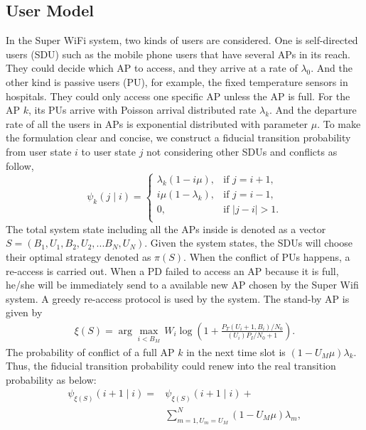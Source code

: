 \documentclass[conference]{IEEEtran}
\begin{document}
\subsection{User Model}
In the Super WiFi system, two kinds of users are considered. One is self-directed users (SDU) such as the mobile phone users that have several APs in its reach. They could decide which AP to access, and they arrive at a rate of \(\lambda_0\). And the other kind is passive users (PU), for example, the fixed temperature sensors in hospitals. They could only access one specific AP unless the AP is full. For the AP \(k\), its PUs arrive with Poisson arrival distributed rate \(\lambda_{k}\). And the departure rate of all the users in APs is exponential distributed with parameter \(\mu\). To make the formulation clear and concise, we construct a fiducial transition probability from user state \(i\) to user state \(j\) not considering other SDUs and conflicts as follow,
\begin{equation} \psi_{k}(j \mid i) =
\begin{cases}
\lambda_k(1 - i\mu), &\mbox{if $j=i+1,$}\\
i\mu(1 - \lambda_k), &\mbox{if $j=i-1,$}\\
0, &\mbox{if $|j-i|>1.$}\\
\end{cases}
\end{equation}
The total system state including all the APs inside is denoted as a vector \(S = (B_1,U_1,B_2,U_2,...B_N,U_N)\). Given the system states, the SDUs will choose their optimal strategy denoted as \(\pi(S)\). When the conflict of PUs happens, a re-access is carried out. When a PD failed to access an AP because it is full, he/she will be immediately send to a available new AP chosen by the Super Wifi system. A greedy re-access protocol is used by the system. The stand-by AP is given by
\begin{equation}
\begin{aligned}
\xi(S)=\arg\underset{i < B_{M}}{\max}\, W_i \log\left(1 + \frac {P_T(U_i + 1, B_i) / N_0} {(U_i)P_I/N_0+1}\right).
\end{aligned}
\end{equation}
The probability of conflict of a full AP \(k\) in the next time slot is \((1-U_M \mu)\lambda_k\). Thus, the fiducial transition probability could renew into the real transition probability as below:
\begin{equation}
\begin{aligned}
\psi_{\xi(S)}(i+1 \mid i)= &\psi_{\xi(S)}(i+1 \mid i) +\\
&\sum_{m = 1,U_m = U_M}^{N}(1-U_M \mu) \lambda_m,\\
\end{aligned}
\end{equation}
\end{document}
